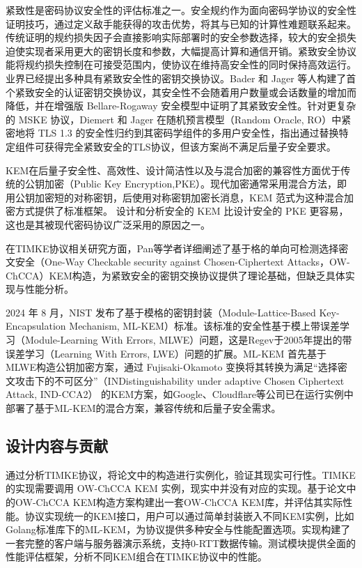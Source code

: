 紧致性是密码协议安全性的评估标准之一。安全规约作为面向密码学协议的安全性证明技巧，通过定义敌手能获得的攻击优势，将其与已知的计算性难题联系起来。传统证明的规约损失因子会直接影响实际部署时的安全参数选择，较大的安全损失迫使实现者采用更大的密钥长度和参数，大幅提高计算和通信开销。紧致安全协议能将规约损失控制在可接受范围内，使协议在维持高安全性的同时保持高效运行。业界已经提出多种具有紧致安全性的密钥交换协议。Bader 和 Jager 等人\cite{bader_tightly-secure_2014}构建了首个紧致安全的认证密钥交换协议，其安全性不会随着用户数量或会话数量的增加而降低，并在增强版 Bellare-Rogaway 安全模型中证明了其紧致安全性。针对更复杂的 MSKE 协议，Diemert 和 Jager \cite{davis_concrete_2022}在随机预言模型（Random Oracle, RO）中紧密地将 TLS 1.3 的安全性归约到其密码学组件的多用户安全性，指出通过替换特定组件可获得完全紧致安全的TLS协议，但该方案尚不满足后量子安全要求。

KEM在后量子安全性、高效性、设计简洁性以及与混合加密的兼容性方面优于传统的公钥加密（Public Key Encryption,PKE）。现代加密通常采用混合方法，即用公钥加密短的对称密钥，后使用对称密钥加密长消息，KEM 范式为这种混合加密方式提供了标准框架。 设计和分析安全的 KEM 比设计安全的 PKE 更容易，这也是其被现代密码协议广泛采用的原因之一。

在TIMKE协议相关研究方面，Pan等学者\cite{pan_lattice-based_2023}详细阐述了基于格的单向可检测选择密文安全（One-Way Checkable security against Chosen-Ciphertext Attacks，OW-ChCCA）KEM构造，为紧致安全的密钥交换协议提供了理论基础，但缺乏具体实现与性能分析。

2024 年 8 月，NIST 发布了基于模格的密钥封装（Module-Lattice-Based Key-Encapsulation Mechanism, ML-KEM）标准\cite{nist_mlkem_2024}。该标准的安全性基于模上带误差学习（Module-Learning With Errors, MLWE）问题，这是Regev于2005年提出的带误差学习（Learning With Errors, LWE）问题的扩展。ML-KEM 首先基于MLWE构造公钥加密方案，通过 Fujisaki-Okamoto 变换将其转换为满足“选择密文攻击下的不可区分”（INDistinguishability under adaptive Chosen Ciphertext Attack, IND-CCA2） 的KEM方案，如Google、Cloudflare等公司已在运行实例中部署了基于ML-KEM的混合方案\cite{noauthor_pqc_2025}，兼容传统和后量子安全需求。

\subsection{设计内容与贡献}

通过分析TIMKE协议，将论文\cite{timke_2024}中的构造进行实例化，验证其现实可行性。TIMKE的实现需要调用 OW-ChCCA KEM 实例，现实中并没有对应的实现。基于论文\cite{pan_lattice-based_2023}中的OW-ChCCA KEM构造方案构建出一套OW-ChCCA KEM库，并评估其实际性能。协议实现统一的KEM接口，用户可以通过简单封装嵌入不同KEM实例，比如Golang标准库下的ML-KEM，为协议提供多种安全与性能配置选项。实现构建了一套完整的客户端与服务器演示系统，支持0-RTT数据传输。测试模块提供全面的性能评估框架，分析不同KEM组合在TIMKE协议中的性能。


